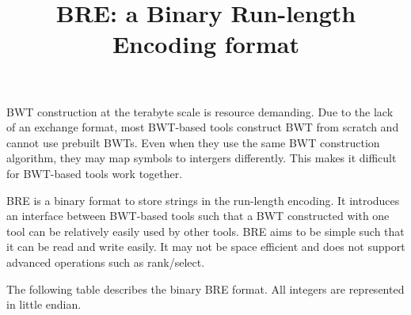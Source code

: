 \documentclass[10pt]{article}
\title{BRE: a Binary Run-length Encoding format}
\author{}
\date{\vspace{-8ex}}
\begin{document}
\maketitle

{\small
BWT construction at the terabyte scale is resource demanding.
Due to the lack of an exchange format, most BWT-based tools construct BWT from scratch and cannot use prebuilt BWTs.
Even when they use the same BWT construction algorithm, they may map symbols to intergers differently.
This makes it difficult for BWT-based tools work together.

BRE is a binary format to store strings in the run-length encoding.
It introduces an interface between BWT-based tools such that a BWT constructed with one tool can be relatively easily used by other tools.
BRE aims to be simple such that it can be read and write easily.
It may not be space efficient and does not support advanced operations such as rank/select.

The following table describes the binary BRE format.
All integers are represented in little endian.
}
\end{document}
